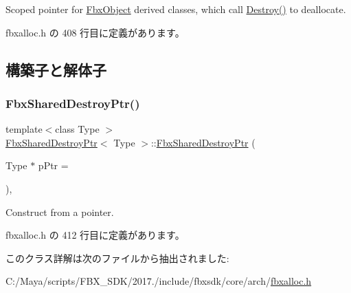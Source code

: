 Scoped pointer for \hyperlink{class_fbx_object}{Fbx\+Object} derived classes, which call \hyperlink{class_fbx_shared_ptr_a706fe3ede6f8a43589348169f4803c75}{Destroy()} to deallocate. 

 fbxalloc.\+h の 408 行目に定義があります。



\subsection{構築子と解体子}
\mbox{\label{class_fbx_shared_destroy_ptr_a5868fc6cf021e68d1100c9aaaf6bf7e7}} 
\subsubsection{\texorpdfstring{Fbx\+Shared\+Destroy\+Ptr()}{FbxSharedDestroyPtr()}}
{\footnotesize\ttfamily template$<$class Type $>$ \\
\hyperlink{class_fbx_shared_destroy_ptr}{Fbx\+Shared\+Destroy\+Ptr}$<$ Type $>$\+::\hyperlink{class_fbx_shared_destroy_ptr}{Fbx\+Shared\+Destroy\+Ptr} (\begin{DoxyParamCaption}\item[{Type $\ast$}]{p\+Ptr = {} }\end{DoxyParamCaption})\hspace{0.3cm}{\ttfamily [inline]}, {\ttfamily [explicit]}}



Construct from a pointer. 



 fbxalloc.\+h の 412 行目に定義があります。



このクラス詳解は次のファイルから抽出されました\+:\begin{DoxyCompactItemize}
\item 
C\+:/\+Maya/scripts/\+F\+B\+X\+\_\+\+S\+D\+K/2017./include/fbxsdk/core/arch/\hyperlink{fbxalloc_8h}{fbxalloc.\+h}\end{DoxyCompactItemize}
